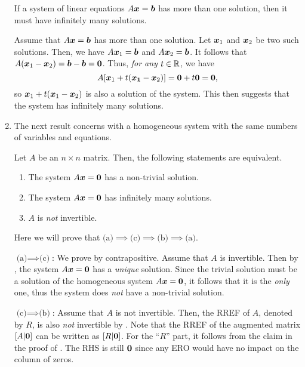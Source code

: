 \begin{enumerate}
\begin{proposition}
\label{prp:sle-more-than-one-sol-inf}
If a system of linear equations \(A\vb*{x}=\vb*{b}\) has more than one
solution, then it must have infinitely many solutions.
\end{proposition}
\begin{pf}
Assume that \(A\vb*{x}=\vb*{b}\) has more than one solution. Let
\(\vb*{x}_1\) and \(\vb*{x}_2\) be two such solutions. Then, we have
\(A\vb*{x}_1=\vb*{b}\) and \(A\vb*{x}_2=\vb*{b}\). It follows that
\(A(\vb*{x}_1-\vb*{x}_2)=\vb*{b}-\vb*{b}=\vb*{0}\). Thus, \emph{for any}
\(t\in\mathbb{R}\), we have
\[
A[\vb*{x}_1+t(\vb*{x_1}-\vb*{x}_2)]
=\vb*{0}+t\vb*{0}
=\vb*{0},
\]
so \(\vb*{x}_1+t(\vb*{x}_1-\vb*{x}_2)\) is also a solution of the system.
This then suggests that the system has infinitely many solutions.
\end{pf}

\item The next result concerns with a homogeneous system with the same numbers
of variables and equations.

\begin{proposition}
\label{prp:homo-same-var-eqs-equiv}
Let \(A\) be an \(n\times n\) matrix. Then, the following statements are
equivalent.
\begin{enumerate}
\item The system \(A\vb*{x}=\vb*{0}\) has a non-trivial solution.
\item The system \(A\vb*{x}=\vb*{0}\) has infinitely many solutions.
\item \(A\) is \emph{not} invertible.
\end{enumerate}
\end{proposition}
\begin{pf}
Here we will prove that \(\text{(a)}\implies \text{(c)}\implies
\text{(b)}\implies \text{(a)}\).

\underline{\(\text{(a)}\implies \text{(c)}\)}: We prove by contrapositive.
Assume that \(A\) is invertible. Then by , the system
\(A\vb*{x}=\vb*{0}\) has a \emph{unique} solution. Since the trivial solution
must be a solution of the homogeneous system \(A\vb*{x}=\vb*{0}\), it follows
that it is the \emph{only} one, thus the system does \emph{not} have a
non-trivial solution.

\underline{\(\text{(c)}\implies\text{(b)}\)}: Assume that \(A\) is not
invertible. Then, the RREF of \(A\), denoted by \(R\), is also \emph{not} invertible
by . Note that the RREF of the augmented matrix
\([A|\vb*{0}]\) can be written as \([R|\vb*{0}]\). For the ``\(R\)'' part, it
follows from the claim in the proof of . The RHS is still
\(\vb*{0}\) since any ERO would have no impact on the column of zeros.


\end{pf}
\end{enumerate}
